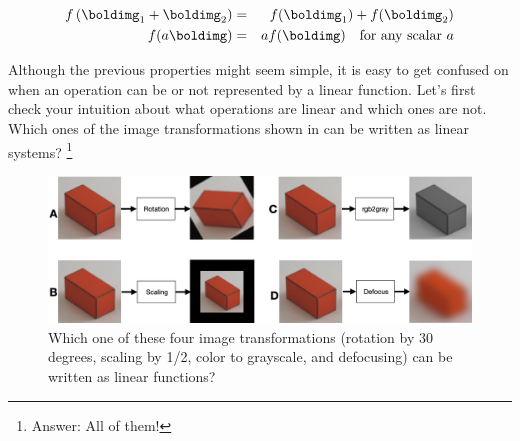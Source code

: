 \begin{eqnarray}
f\left( \boldimg_1+\boldimg_2 \right) &=& f(\boldimg_1)+ f(\boldimg_2) \\ \nonumber
f(a\boldimg) &=& af(\boldimg) ~~\text{~for any scalar~} a
\end{eqnarray}

Although the previous properties might seem simple, it is easy to get confused on when an operation can be or not represented by a linear function. Let's first check your intuition about what operations are linear and which ones are not. Which ones of the image transformations shown in \fig{\ref{fig:transformationsquizz}} can be written as linear systems? \footnote{Answer: All of them!}


\begin{figure}[t]
\centerline{
\includegraphics[width=1\linewidth]{figures/linear_image_filtering/whichoneislinear.png}
} 
\caption{Which one of these four image transformations (rotation by 30 degrees, scaling by 1/2, color to grayscale, and defocusing) can be written as linear functions?}
\label{fig:transformationsquizz}
\end{figure}

